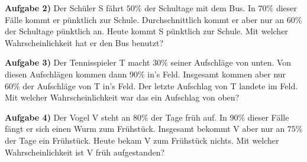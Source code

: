 \documentclass{article}
\begin{document}
 \textbf{Aufgabe 2)} Der Sch\"uler S f\"ahrt $50\%$ der Schultage mit dem Bus. In $70\%$ dieser F\"alle kommt er p\"unktlich zur Schule. Durchschnittlich kommt er aber nur an $60\%$ der Schultage p\"unktlich an. Heute kommt S p\"unktlich zur Schule. Mit welcher Wahrscheinlichkeit hat er den Bus benutzt?

\textbf{Aufgabe 3)} Der Tennisspieler T macht $30\%$ seiner Aufschl\"age von unten. Von diesen Aufschl\"agen kommen dann $90\%$ in's Feld. Insgesamt kommen aber nur $60\%$ der Aufschl\"age von T in's Feld. Der letzte Aufschlag von T landete im Feld. Mit welcher Wahrscheinlichkeit war das ein Aufschlag von oben?

\textbf{Aufgabe 4)} Der Vogel V steht an $80\%$ der Tage fr\"uh auf. In $90\%$ dieser F\"alle f\"angt er sich einen Wurm zum Fr\"uhst\"uck. Insgesamt bekommt V aber nur an $75\%$ der Tage ein Fr\"uhst\"uck. Heute bekam V zum Fr\"uhst\"uck nichts. Mit welcher Wahrscheinlichkeit ist V fr\"uh aufgestanden? 
\end{document}
